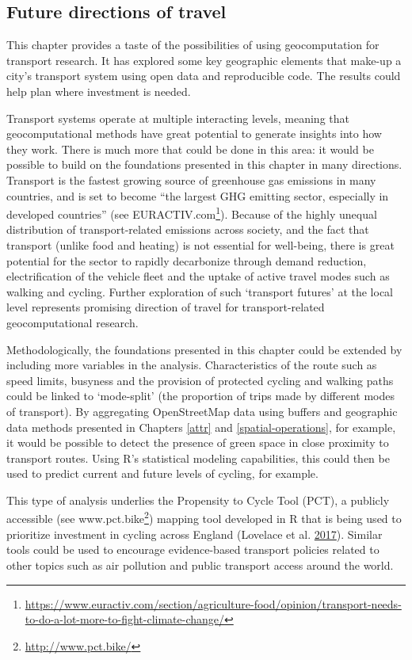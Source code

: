 \documentclass[]{krantz}
\let\rmarkdownfootnote\footnote%
\def\footnote{\protect\rmarkdownfootnote}
\renewcommand{\href}[2]{#2\footnote{\url{#1}}}
\begin{document}
\hypertarget{future-directions-of-travel}{%
\subsection{Future directions of travel}\label{future-directions-of-travel}}

This chapter provides a taste of the possibilities of using geocomputation for transport research.
It has explored some key geographic elements that make-up a city's transport system using open data and reproducible code.
The results could help plan where investment is needed.

Transport systems operate at multiple interacting levels, meaning that geocomputational methods have great potential to generate insights into how they work.
There is much more that could be done in this area: it would be possible to build on the foundations presented in this chapter in many directions.
Transport is the fastest growing source of greenhouse gas emissions in many countries, and is set to become ``the largest GHG emitting sector, especially in developed countries'' (see \href{https://www.euractiv.com/section/agriculture-food/opinion/transport-needs-to-do-a-lot-more-to-fight-climate-change/}{EURACTIV.com}).
Because of the highly unequal distribution of transport-related emissions across society, and the fact that transport (unlike food and heating) is not essential for well-being, there is great potential for the sector to rapidly decarbonize through demand reduction, electrification of the vehicle fleet and the uptake of active travel modes such as walking and cycling.
Further exploration of such `transport futures' at the local level represents promising direction of travel for transport-related geocomputational research.

Methodologically, the foundations presented in this chapter could be extended by including more variables in the analysis.
Characteristics of the route such as speed limits, busyness and the provision of protected cycling and walking paths could be linked to `mode-split' (the proportion of trips made by different modes of transport).
By aggregating OpenStreetMap data using buffers and geographic data methods presented in Chapters \ref{attr} and \ref{spatial-operations}, for example, it would be possible to detect the presence of green space in close proximity to transport routes.
Using R's statistical modeling capabilities, this could then be used to predict current and future levels of cycling, for example.

This type of analysis underlies the Propensity to Cycle Tool (PCT), a publicly accessible (see \href{http://www.pct.bike/}{www.pct.bike}) mapping tool developed in R that is being used to prioritize investment in cycling across England (Lovelace et al. \protect\hyperlink{ref-lovelace_propensity_2017}{2017}).
Similar tools could be used to encourage evidence-based transport policies related to other topics such as air pollution and public transport access around the world.
\end{document}
